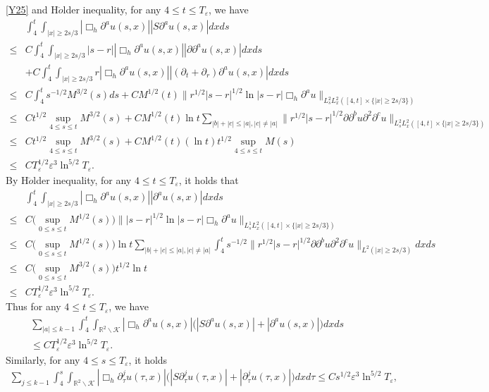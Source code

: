 \documentclass[11pt, reqno]{amsart}
\theoremstyle{definition}
\theoremstyle{remark}
\theoremstyle{definition}
\numberwithin{equation}{section}
\numberwithin{equation}{section}
\def\leq{\leqslant}
\def\geq{\geqslant}
\begin{document}
\eqref{Y25} and H$\ddot{o}$lder inequality, for any $4\leq t\leq T_{\varepsilon}$, we have
\begin{align*}
&\int_4^t\int_{|x|\geq2s/3}|\Box_h\partial^au(s,x)||S\partial^au(s,x)|dxds
\\\leq& C\int_4^t\int_{|x|\geq2s/3}|s-r||\Box_h\partial^au(s,x)||\partial\partial^au(s,x)|dxds
\\&+C\int_4^t\int_{|x|\geq2s/3}r|\Box_h\partial^au(s,x)||(\partial_t+\partial_r)\partial^au(s,x)|dxds
\\\leq& C\int_4^ts^{-1/2}M^{3/2}(s)ds+CM^{1/2}(t)\|r^{1/2}|s-r|^{1/2}\ln|s-r|\Box_h\partial^au\|_{L_s^2L_x^2([4,t]\times\{|x|\geq2s/3\})}
\\\leq& Ct^{1/2}\sup_{4\leq s\leq t}M^{3/2}(s)+CM^{1/2}(t)\ln t\sum_{|b|+|c|\leq |a|,|c|\neq 
|a|}\|r^{1/2}|s-r|^{1/2}\partial\partial^bu\partial^2\partial^cu\|_{L_s^2L_x^2([4,t]\times\{|x|\geq2s/3\})}
\\\leq& Ct^{1/2}\sup_{4\leq s\leq t}M^{3/2}(s)+CM^{1/2}(t)(\ln t) t^{1/2}\sup_{4\leq s\leq t}M(s)
\\\leq& CT_{\varepsilon}^{1/2}\varepsilon^3\ln^{5/2}T_{\varepsilon}.
\end{align*}
By H$\ddot{o}$lder inequality, for any $4\leq t\leq T_{\varepsilon}$, it holds that
\begin{align*}
&\int_4^t\int_{|x|\geq2s/3}|\Box_h\partial^au(s,x)||\partial^au(s,x)|dxds
\\\leq& C\Big(\sup_{0\leq s\leq t}M^{1/2}(s)\Big)\||s-r|^{1/2}\ln|s-r|\Box_h\partial^au\|_{L^1_sL_x^2([4,t]\times\{|x|\geq 2s/3\})}
\\\leq& C\Big(\sup_{0\leq s\leq t}M^{1/2}(s)\Big)\ln t\sum_{|b|+|c|\leq 
|a|,|c|\neq|a|}\int_4^ts^{-1/2}\|r^{1/2}|s-r|^{1/2}\partial\partial^bu\partial^2\partial^cu\|_{L^2(|x|\geq 2s/3)}dxds
\\\leq& C\Big(\sup_{0\leq s\leq t}M^{3/2}(s)\Big)t^{1/2}\ln t
\\\leq& CT_{\varepsilon}^{1/2}\varepsilon^3\ln^{5/2}T_{\varepsilon}.
\end{align*}
Thus for any $4\leq t\leq T_{\varepsilon}$, we have
\begin{align}\label{Y49}
&\sum_{|a|\leq k-1}\int_4^t\int_{\mathbb R^2\backslash\mathcal
{K}}|\Box_h\partial^au(s,x)|\big(|S\partial^au(s,x)|+|\partial^au(s,x)|\big)dxds
\nonumber\\&\leq
CT_{\varepsilon}^{1/2}\varepsilon^3\ln^{5/2}T_{\varepsilon}.
\end{align}
Similarly, for any $4\leq s\leq T_{\varepsilon}$, it holds
\begin{align*}
\sum_{j\leq k-1}\int_4^s\int_{\mathbb R^2\backslash\mathcal
{K}}|\Box_h\partial_{\tau}^ju(\tau,x)|\big(|S\partial_{\tau}^ju(\tau,x)|+|\partial_{\tau}^ju(\tau,x)|\big)dxd\tau
\leq Cs^{1/2}\varepsilon^3\ln^{5/2}T_{\varepsilon},
\end{align*}
\end{document}
